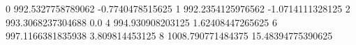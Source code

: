0 992.5327758789062 -0.7740478515625
1 992.2354125976562 -1.0714111328125
2 993.3068237304688 0.0
4 994.930908203125 1.62408447265625
6 997.1166381835938 3.809814453125
8 1008.790771484375 15.48394775390625
